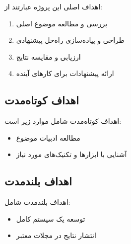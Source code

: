 اهداف اصلی این پروژه عبارتند از:

\begin{enumerate}
    \item بررسی و مطالعه موضوع اصلی
    \item طراحی و پیاده‌سازی راه‌حل پیشنهادی
    \item ارزیابی و مقایسه نتایج
    \item ارائه پیشنهادات برای کارهای آینده
\end{enumerate}

\subsection{اهداف کوتاه‌مدت}
اهداف کوتاه‌مدت شامل موارد زیر است:
\begin{itemize}
    \item مطالعه ادبیات موضوع
    \item آشنایی با ابزارها و تکنیک‌های مورد نیاز
\end{itemize}

\subsection{اهداف بلندمدت}
اهداف بلندمدت شامل:
\begin{itemize}
    \item توسعه یک سیستم کامل
    \item انتشار نتایج در مجلات معتبر
\end{itemize}

